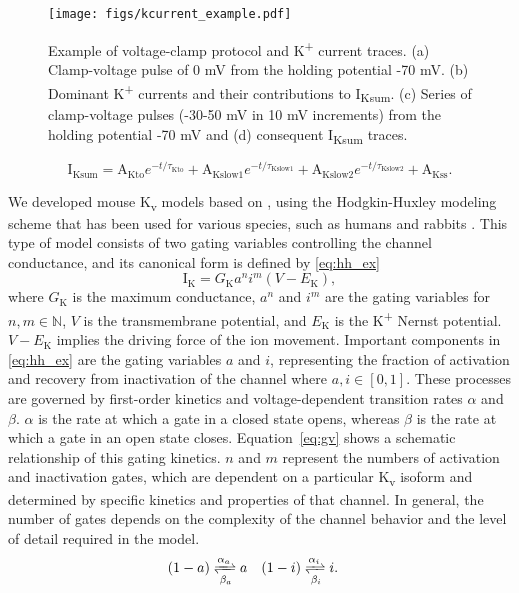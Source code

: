 \documentclass[11pt]{article}
\begin{document}
\begin{figure}[!ht]
    \centering
    \texttt{[image: figs/kcurrent\_example.pdf]}
    \caption{Example of voltage-clamp protocol and K\textsuperscript{+} current traces. (a) Clamp-voltage pulse of 0 mV from the holding potential -70 mV. (b) Dominant K\textsuperscript{+} currents and their contributions to I\textsubscript{Ksum}. (c) Series of clamp-voltage pulses (-30-50 mV in 10 mV increments) from the holding potential -70 mV and (d) consequent I\textsubscript{Ksum} traces.}
    \label{fig:kcurrent_example}
\end{figure}
\begin{equation}
    \label{eq:expl_fitting}
    \mathrm{I}_{\mathrm{Ksum}} = \mathrm{A}_{\mathrm{Kto}}e^{-t/\tau_{\mathrm{Kto}}} + \mathrm{A}_{\mathrm{Kslow1}}e^{-t/\tau_{\mathrm{Kslow1}}} + \mathrm{A}_{\mathrm{Kslow2}}e^{-t/\tau_{\mathrm{Kslow2}}} +  \mathrm{A}_{\mathrm{Kss}}.   
\end{equation}

We developed mouse K\textsubscript{v} models based on \citep{bondarenko2014compartmentalized,asfaw2020compartmentalized}, using the Hodgkin-Huxley modeling scheme that has been used for various species, such as humans \citep{ten2004model} and rabbits \citep{mahajan2008rabbit}. This type of model consists of two gating variables controlling the channel conductance, and its canonical form is defined by \eqref{eq:hh_ex}
\begin{equation}
    \label{eq:hh_ex}
    \mathrm{I}_{\mathrm{K}} = G_{\mathrm{K}}a^{n}i^{m}(V-E_{\mathrm{K}}),
\end{equation}
where $G_{\mathrm{K}}$ is the maximum conductance, $a^{n}$ and $i^{m}$ are the gating variables for $n,m \in \mathbb{N}$, $V$ is the transmembrane potential, and $E_{\mathrm{K}}$ is the K\textsuperscript{+} Nernst potential. $V-E_{\mathrm{K}}$ implies the driving force of the ion movement. Important components in \eqref{eq:hh_ex} are the gating variables $a$ and $i$, representing the fraction of activation and recovery from inactivation of the channel where $a,i \in [0,1]$. These processes are governed by first-order kinetics and voltage-dependent transition rates $\alpha$ and $\beta$. $\alpha$ is the rate at which a gate in a closed state opens, whereas $\beta$ is the rate at which a gate in an open state closes. Equation~\eqref{eq:gv} shows a schematic relationship of this gating kinetics. $n$ and $m$ represent the numbers of activation and inactivation gates, which are dependent on a particular K\textsubscript{v} isoform and determined by specific kinetics and properties of that channel. In general, the number of gates depends on the complexity of the channel behavior and the level of detail required in the model. 
\begin{align}
    \label{eq:gv}
    (1-a)&\xrightleftharpoons[\beta_{a}]{\alpha_{a}}a & (1-i)&\xrightleftharpoons[\beta_{i}]{\alpha_{i}}i.
\end{align}
\end{document}
